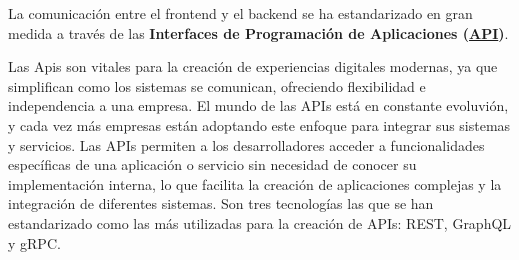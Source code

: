 La comunicaci\'{o}n entre el frontend y el backend se ha estandarizado en gran medida a trav\'{e}s de las \textbf{Interfaces de Programaci\'{o}n de Aplicaciones (\hyperlink{api}{API})}. 

Las Apis son vitales para la creación de experiencias digitales modernas, ya que simplifican como los sistemas se comunican, ofreciendo flexibilidad e independencia a una empresa. El mundo de las APIs está en constante evoluvión, y cada vez más empresas están adoptando este enfoque para integrar sus sistemas y servicios. Las APIs permiten a los desarrolladores acceder a funcionalidades específicas de una aplicación o servicio sin necesidad de conocer su implementación interna, lo que facilita la creación de aplicaciones complejas y la integración de diferentes sistemas.
\newline
Son tres tecnologías las que se han estandarizado como las más utilizadas para la creación de APIs: REST, GraphQL y gRPC.

